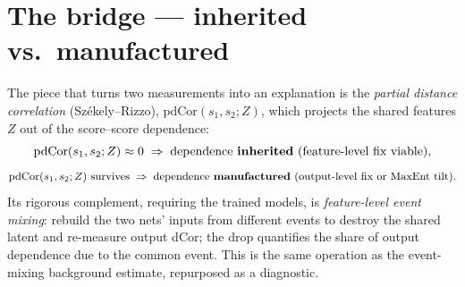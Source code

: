 \documentclass[11pt]{article}
\newcommand{\pdcor}{\mathrm{pdCor}}
\begin{document}
\section{The bridge --- inherited vs.\ manufactured}
The piece that turns two measurements into an explanation is the
\emph{partial distance correlation} (Sz\'ekely--Rizzo), $\pdcor(s_1,s_2;Z)$,
which projects the shared features $Z$ out of the score--score dependence:
\begin{equation}
\pdcor(s_1,s_2;Z)\approx 0 \;\Rightarrow\; \text{dependence \textbf{inherited}
(feature-level fix viable)},
\end{equation}
\begin{equation}
\pdcor(s_1,s_2;Z)\ \text{survives} \;\Rightarrow\; \text{dependence
\textbf{manufactured} (output-level fix or MaxEnt tilt)}.
\end{equation}
Its rigorous complement, requiring the trained models, is \emph{feature-level
event mixing}: rebuild the two nets' inputs from different events to destroy the
shared latent and re-measure output dCor; the drop quantifies the share of
output dependence due to the common event. This is the same operation as the
event-mixing background estimate, repurposed as a diagnostic.
\end{document}
